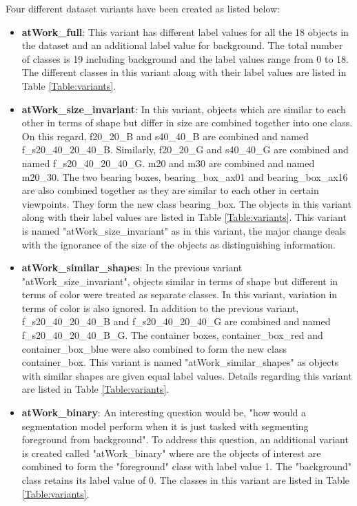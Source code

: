 	Four different dataset variants have been created as listed below:
	\begin{itemize}
		\item \textbf{atWork\_full}: This variant has different label values for all the 18 objects in the dataset and an additional label value for background. The total number of classes is 19 including background and the label values range from 0 to 18. The different classes in this variant along with their label values are listed in Table \ref{Table:variants}.
		\item \textbf{atWork\_size\_invariant}: In this variant, objects which are similar to each other in terms of shape but differ in size are combined together into one class. On this regard, f20\_20\_B and s40\_40\_B are combined and named f\_s20\_40\_20\_40\_B. Similarly, f20\_20\_G and s40\_40\_G are combined and named f\_s20\_40\_20\_40\_G. m20 and m30 are combined and named m20\_30. The two bearing boxes, bearing\_box\_ax01 and bearing\_box\_ax16 are also combined together as they are similar to each other in certain viewpoints. They form the new class bearing\_box. The objects in this variant along with their label values are listed in Table \ref{Table:variants}. This variant is named "atWork\_size\_invariant" as in this variant, the major change deals with the ignorance of the size of the objects as distinguishing information.
		\item \textbf{atWork\_similar\_shapes}: In the previous variant "atWork\_size\_invariant", objects similar in terms of shape but different in terms of color were treated as separate classes. In this variant, variation in terms of color is also ignored. In addition to the previous variant, f\_s20\_40\_20\_40\_B and f\_s20\_40\_20\_40\_G are combined and named f\_s20\_40\_20\_40\_B\_G. The container boxes, container\_box\_red and container\_box\_blue were also combined to form the new class container\_box. This variant is named "atWork\_similar\_shapes" as objects with similar shapes are given equal label values. Details regarding this variant are listed in Table \ref{Table:variants}.
		\item \textbf{atWork\_binary}: An interesting question would be, "how would a segmentation model perform when it is just tasked with segmenting foreground from background". To address this question, an additional variant is created called "atWork\_binary" where are the objects of interest are combined to form the "foreground" class with label value 1. The "background" class retains its label value of 0. The classes in this variant are listed in Table \ref{Table:variants}.
		

\end{itemize}

